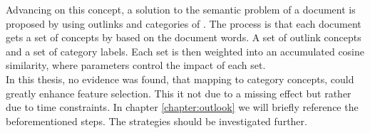   Advancing on this concept, a solution to the semantic problem of a document is proposed by \cite{WikipediaClustering2010} using outlinks and categories of \wiki{}. The process is that each document gets a set of concepts by \wiki{} based on the document words. A set of outlink concepts and a set of category labels. Each set is then weighted into an accumulated cosine similarity, where parameters control the impact of each set.\\

  In this thesis, no evidence was found, that mapping to category concepts, could greatly enhance feature selection. This it not due to a missing effect but rather due to time constraints. In chapter \ref{chapter:outlook} we will briefly reference the beforementioned steps. The strategies should be investigated further.

